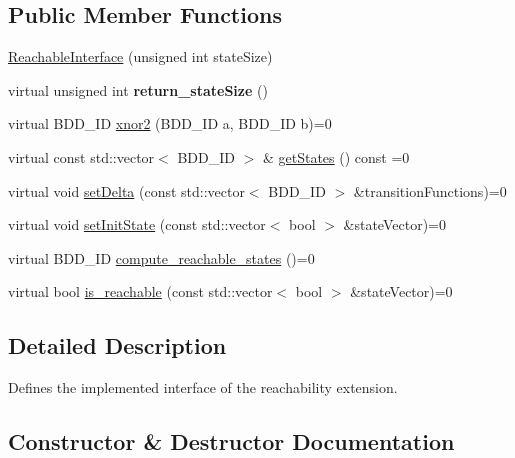 \subsection*{Public Member Functions}
\begin{DoxyCompactItemize}
\item 
\hyperlink{classClassProject_1_1ReachableInterface_a80afbca3170ebe434924fb7625cc9025}{Reachable\+Interface} (unsigned int state\+Size)
\item 
\mbox{\label{classClassProject_1_1ReachableInterface_ac6d3bf3f4b98c775a944053f3dbffd69}} 
virtual unsigned int {\bfseries return\+\_\+state\+Size} ()
\item 
virtual B\+D\+D\+\_\+\+ID \hyperlink{classClassProject_1_1ReachableInterface_a80163dcb8b1d982b4fb7f8614808dece}{xnor2} (B\+D\+D\+\_\+\+ID a, B\+D\+D\+\_\+\+ID b)=0
\item 
virtual const std\+::vector$<$ B\+D\+D\+\_\+\+ID $>$ \& \hyperlink{classClassProject_1_1ReachableInterface_a8546499fbc6d0da61b6b21f8db8e4621}{get\+States} () const =0
\item 
virtual void \hyperlink{classClassProject_1_1ReachableInterface_a88f9a34f7272c3f971e757aa2b140746}{set\+Delta} (const std\+::vector$<$ B\+D\+D\+\_\+\+ID $>$ \&transition\+Functions)=0
\item 
virtual void \hyperlink{classClassProject_1_1ReachableInterface_a005d8d8375b8d4e9f7c7d1a0ff01a97f}{set\+Init\+State} (const std\+::vector$<$ bool $>$ \&state\+Vector)=0
\item 
virtual B\+D\+D\+\_\+\+ID \hyperlink{classClassProject_1_1ReachableInterface_a84a2fe53f724c184266fc22f17204499}{compute\+\_\+reachable\+\_\+states} ()=0
\item 
virtual bool \hyperlink{classClassProject_1_1ReachableInterface_aa3011f06562431832cf563b77fb36c13}{is\+\_\+reachable} (const std\+::vector$<$ bool $>$ \&state\+Vector)=0
\end{DoxyCompactItemize}


\subsection{Detailed Description}
Defines the implemented interface of the reachability extension. 

\subsection{Constructor \& Destructor Documentation}
\mbox{\label{classClassProject_1_1ReachableInterface_a80afbca3170ebe434924fb7625cc9025}} 
